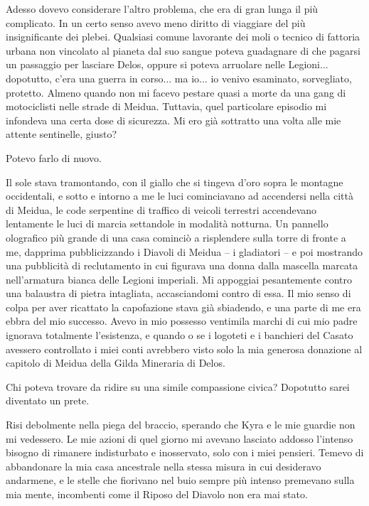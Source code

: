\begin{figure}
	\centering
	\def\svgwidth{\columnwidth}
	\scalebox{0.2}{}
\end{figure}

Adesso dovevo considerare l'altro problema, che era di gran lunga il più
complicato. In un certo senso avevo meno diritto di viaggiare del più
insignificante dei plebei. Qualsiasi comune lavorante dei moli o tecnico
di fattoria urbana non vincolato al pianeta dal suo sangue poteva
guadagnare di che pagarsi un passaggio per lasciare Delos, oppure si
poteva arruolare nelle Legioni... dopotutto, c'era una guerra in
corso... ma io... io venivo esaminato, sorvegliato, protetto. Almeno
quando non mi facevo pestare quasi a morte da una gang di motociclisti
nelle strade di Meidua. Tuttavia, quel particolare episodio mi infondeva
una certa dose di sicurezza. Mi ero già sottratto una volta alle mie
attente sentinelle, giusto?

Potevo farlo di nuovo.

Il sole stava tramontando, con il giallo che si tingeva d'oro sopra le
montagne occidentali, e sotto e intorno a me le luci cominciavano ad
accendersi nella città di Meidua, le code serpentine di traffico di
veicoli terrestri accendevano lentamente le luci di marcia settandole in
modalità notturna. Un pannello olografico più grande di una casa
cominciò a risplendere sulla torre di fronte a me, dapprima
pubblicizzando i Diavoli di Meidua -- i gladiatori -- e poi mostrando
una pubblicità di reclutamento in cui figurava una donna dalla mascella
marcata nell'armatura bianca delle Legioni imperiali. Mi appoggiai
pesantemente contro una balaustra di pietra intagliata, accasciandomi
contro di essa. Il mio senso di colpa per aver ricattato la capofazione
stava già sbiadendo, e una parte di me era ebbra del mio successo. Avevo
in mio possesso ventimila marchi di cui mio padre ignorava totalmente
l'esistenza, e quando o se i logoteti e i banchieri del Casato avessero
controllato i miei conti avrebbero visto solo la mia generosa donazione
al capitolo di Meidua della Gilda Mineraria di Delos.

Chi poteva trovare da ridire su una simile compassione civica? Dopotutto
sarei diventato un prete.

Risi debolmente nella piega del braccio, sperando che Kyra e le mie
guardie non mi vedessero. Le mie azioni di quel giorno mi avevano
lasciato addosso l'intenso bisogno di rimanere indisturbato e
inosservato, solo con i miei pensieri. Temevo di abbandonare la mia casa
ancestrale nella stessa misura in cui desideravo andarmene, e le stelle
che fiorivano nel buio sempre più intenso premevano sulla mia mente,
incombenti come il Riposo del Diavolo non era mai stato.

